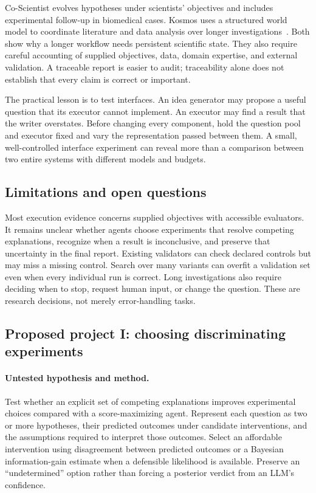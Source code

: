 Co-Scientist evolves hypotheses under scientists' objectives and includes experimental follow-up in biomedical cases. Kosmos uses a structured world model to coordinate literature and data analysis over longer investigations~\cite{co-scientist,kosmos}. Both show why a longer workflow needs persistent scientific state. They also require careful accounting of supplied objectives, data, domain expertise, and external validation. A traceable report is easier to audit; traceability alone does not establish that every claim is correct or important.

The practical lesson is to test interfaces. An idea generator may propose a useful question that its executor cannot implement. An executor may find a result that the writer overstates. Before changing every component, hold the question pool and executor fixed and vary the representation passed between them. A small, well-controlled interface experiment can reveal more than a comparison between two entire systems with different models and budgets.

\subsection{Limitations and open questions}

Most execution evidence concerns supplied objectives with accessible evaluators. It remains unclear whether agents choose experiments that resolve competing explanations, recognize when a result is inconclusive, and preserve that uncertainty in the final report. Existing validators can check declared controls but may miss a missing control. Search over many variants can overfit a validation set even when every individual run is correct. Long investigations also require deciding when to stop, request human input, or change the question. These are research decisions, not merely error-handling tasks.

\subsection{Proposed project I: choosing discriminating experiments}

\paragraph{Untested hypothesis and method.}
Test whether an explicit set of competing explanations improves experimental choices compared with a score-maximizing agent. Represent each question as two or more hypotheses, their predicted outcomes under candidate interventions, and the assumptions required to interpret those outcomes. Select an affordable intervention using disagreement between predicted outcomes or a Bayesian information-gain estimate when a defensible likelihood is available. Preserve an ``undetermined'' option rather than forcing a posterior verdict from an LLM's confidence.

